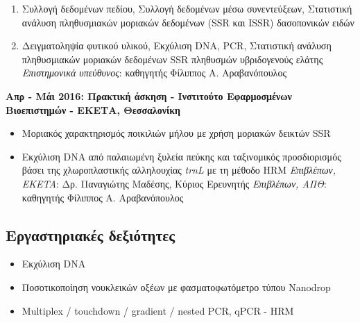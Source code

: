 \documentclass[12pt,]{scrartcl}
\begin{document}
\vspace{3mm}
\begin{enumerate}

\vspace{-3mm}
\setlength\itemsep{-0.6em}
\item Συλλογή δεδομένων πεδίου, Συλλογή δεδομένων μέσω συνεντεύξεων, Στατιστική ανάλυση πληθυσμιακών μοριακών δεδομένων (SSR και ISSR) δασοπονικών ειδών 
\item Δειγματοληψία φυτικού υλικού, Εκχύλιση DNA, PCR, Στατιστική ανάλυση πληθυσμιακών μοριακών δεδομένων SSR πληθυσμών υβριδογενούς ελάτης
\vspace{2mm}
\newline
\textit{Επιστημονικά υπεύθυνος}: καθηγητής Φίλιππος Α. Αραβανόπουλος
\end{enumerate}

\vspace{3mm}
\textbf{Απρ - Μάι 2016: Πρακτική άσκηση - Ινστιτούτο Εφαρμοσμένων Βιοεπιστημών - ΕΚΕΤΑ, Θεσσαλονίκη}


\vspace{3mm}
\begin{itemize}
\vspace{-3mm}
\setlength\itemsep{-0.6em}
\item Μοριακός χαρακτηρισμός ποικιλιών μήλου με χρήση μοριακών δεικτών SSR 
\item Εκχύλιση DNA από παλαιωμένη ξυλεία πεύκης και ταξινομικός προσδιορισμός βάσει της χλωροπλαστικής αλληλουχίας \textit{trnL} με τη μέθοδο HRM
\vspace{2mm}
\newline
\textit{Επιβλέπων, EKETA}: Δρ. Παναγιώτης Μαδέσης, Κύριος Ερευνητής
\newline
\textit{Επιβλέπων, ΑΠΘ}: καθηγητής Φίλιππος Α. Αραβανόπουλος
\end{itemize}


\subsection{Εργαστηριακές δεξιότητες}\label{lab}
\begin{itemize}
\vspace{-3mm}
\setlength\itemsep{-0.6em}
\item Εκχύλιση DNA%
\item Ποσοτικοποίηση νουκλεικών οξέων με φασματοφωτόμετρο τύπου Nanodrop
\item Multiplex / touchdown / gradient / nested PCR, qPCR - HRM
\end{itemize}
\end{document}
